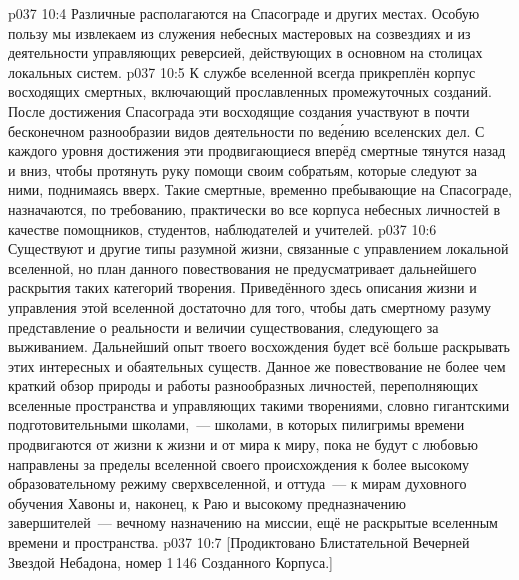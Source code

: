 \vs p037 10:4 \pc Различные  располагаются на Спасограде и других местах. Особую пользу мы извлекаем из служения небесных мастеровых на созвездиях и из деятельности управляющих реверсией, действующих в основном на столицах локальных систем.
\vs p037 10:5 К службе вселенной всегда прикреплён корпус восходящих смертных, включающий прославленных промежуточных созданий. После достижения Спасограда эти восходящие создания участвуют в почти бесконечном разнообразии видов деятельности по вед\'ению вселенских дел. С каждого уровня достижения эти продвигающиеся вперёд смертные тянутся назад и вниз, чтобы протянуть руку помощи своим собратьям, которые следуют за ними, поднимаясь вверх. Такие смертные, временно пребывающие на Спасограде, назначаются, по требованию, практически во все корпуса небесных личностей в качестве помощников, студентов, наблюдателей и учителей.
\vs p037 10:6 Существуют и другие типы разумной жизни, связанные с управлением локальной вселенной, но план данного повествования не предусматривает дальнейшего раскрытия таких категорий творения. Приведённого здесь описания жизни и управления этой вселенной достаточно для того, чтобы дать смертному разуму представление о реальности и величии существования, следующего за выживанием. Дальнейший опыт твоего восхождения будет всё больше раскрывать этих интересных и обаятельных существ. Данное же повествование не более чем краткий обзор природы и работы разнообразных личностей, переполняющих вселенные пространства и управляющих такими творениями, словно гигантскими подготовительными школами,~--- школами, в которых пилигримы времени продвигаются от жизни к жизни и от мира к миру, пока не будут с любовью направлены за пределы вселенной своего происхождения к более высокому образовательному режиму сверхвселенной, и оттуда~--- к мирам духовного обучения Хавоны и, наконец, к Раю и высокому предназначению завершителей~--- вечному назначению на миссии, ещё не раскрытые вселенным времени и пространства.
\vsetoff
\vs p037 10:7 [Продиктовано Блистательной Вечерней Звездой Небадона, номер 1\,146 Созданного Корпуса.]
\quizlink
